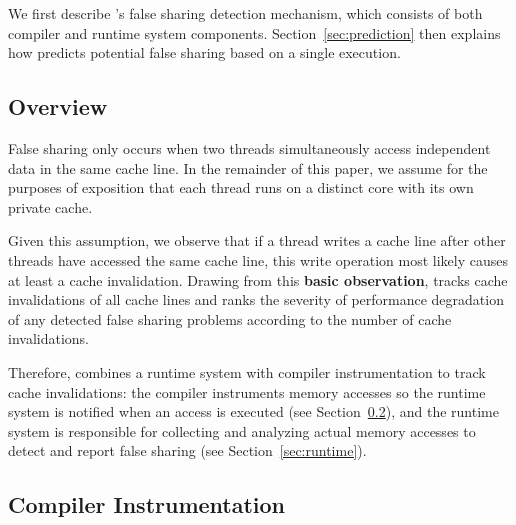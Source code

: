 \label{sec:detection}

We first describe \Predator{}'s false sharing detection mechanism, which consists of both compiler and runtime system
components. Section~\ref{sec:prediction} then explains how \Predator{} predicts potential false sharing based on a single execution.

\subsection{Overview}
\label{sec:overview}
False sharing only occurs when two threads
simultaneously access independent data in the same cache line.
In the remainder of this paper, we assume for the purposes of exposition that each thread runs on a 
distinct core with its own private cache.

Given this assumption, we observe that 
if a thread writes a cache line after other threads have 
accessed the same cache line, this write operation most likely causes at least a cache invalidation. Drawing from this \textbf{basic observation}, \Predator{} tracks cache invalidations of all cache lines and ranks the severity of performance degradation of any detected false sharing problems according to the number of cache invalidations. 
 

Therefore, \Predator{} combines a runtime system with compiler
instrumentation to track cache invalidations: the compiler
instruments memory accesses so the runtime system is notified when an access is executed (see Section~\ref{sec:compiler}), and the runtime system is responsible for collecting and analyzing actual memory accesses to detect and report false sharing (see Section~\ref{sec:runtime}).

\subsection{Compiler Instrumentation}
\label{sec:compiler}

